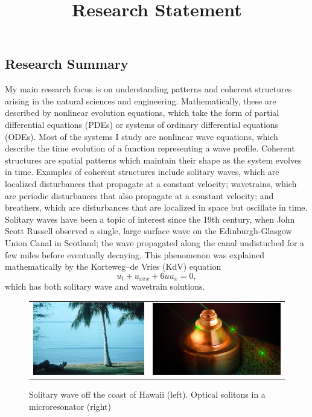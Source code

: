 \documentclass[11pt,reqno,oneside]{article}
\title{Research Statement}
\date{\vspace{-12ex}}
\theoremstyle{definition}
\theoremstyle{remark}
\begin{document}
\thispagestyle{empty}


\subsection*{Research Summary}

My main research focus is on understanding patterns and coherent structures arising in the natural sciences and engineering. Mathematically, these are described by nonlinear evolution equations, which take the form of partial differential equations (PDEs) or systems of ordinary differential equations (ODEs). Most of the systems I study are nonlinear wave equations, which describe the time evolution of a function representing a wave profile. Coherent structures are spatial patterns which maintain their shape as the system evolves in time. 
Examples of coherent structures include solitary waves, which are localized disturbances that propagate at a constant velocity; wavetrains, which are periodic disturbances that also propagate at a constant velocity; and breathers, which are disturbances that are localized in space but oscillate in time. 
Solitary waves have been a topic of interest since the 19th century, when John Scott Russell observed a single, large surface wave on the Edinburgh-Glasgow Union Canal in Scotland; the wave propagated along the canal undisturbed for a few miles before eventually decaying. 
This phenomenon was explained mathematically by the Korteweg–de Vries (KdV) equation 
\[
u_t + u_{xxx} + 6 u u_x = 0,
\]
which has both solitary wave and wavetrain solutions.
\begin{figure}[H]
    \centering
    \begin{tabular}{cc}
        \includegraphics[width=7cm]{images/SolitaryWaveHawaii.png} &
        \includegraphics[width=8.1cm]{images/resonator.jpg}      
    \end{tabular}
    \caption{Solitary wave off the coast of Hawaii \cite{Andriopoulos2009} (left). Optical solitons in a microresonator \cite{MarinPalomo2017} (right) }
    \label{fig:solitarywaves}
\end{figure}
\end{document}
